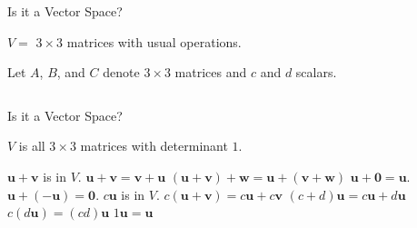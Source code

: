 \documentclass[xcolor=dvipsnames,aspectratio=169,t]{beamer}
\begin{document}
\begin{frame}{Is it a Vector Space?}
\bigskip

$V=$ $3 \times 3$ matrices with usual operations.
\bigskip

\pause
Let $A$, $B$, and $C$ denote $3 \times 3$ matrices and $c$ and $d$ scalars.

\begin{columns}[T]

\column{0.5\tw}
\bb
\ii {} \smallskip
\ii {} \smallskip
\ii {}
\ii {}
\ii  {}
\ee

\column{0.5\tw}

\bb
\addtocounter{enumi}{5}
\ii {} \ms
\ii  {} \ms
\ii  {} \ms 
\ii {} \ms
\ii {}
\ee

\end{columns}

\end{frame}


\begin{frame}{Is it a Vector Space?}
\bigskip

$V$ is all $3 \times 3$ matrices with \alert{determinant $1$}.
\bigskip

\begin{enumerate}\setlength{\itemsep}{.3em}
\ii $\mathbf{u} + \mathbf{v}$ is in $V$. 
\ii $\mathbf{u} + \mathbf{v} = \mathbf{v} + \mathbf{u}$
\ii $(\mathbf{u} + \mathbf{v}) + \mathbf{w} = \mathbf{u} + (\mathbf{v} + \mathbf{w})$
\ii $\mathbf{u} + \mathbf{0} = \mathbf{u}$.
\ii $\mathbf{u} + (- \mathbf{u}) = \mathbf{0}$.
\ii $c \mathbf{u}$ is in $V$.
\ii $c( \mathbf{u} + \mathbf{v} ) = c \mathbf{u} + c \mathbf{v}$
\ii $(c+d)  \mathbf{u} = c \mathbf{u} + d \mathbf{u}$
\ii $c (d \mathbf{u}) = (cd) \mathbf{u}$
\ii $1 \mathbf{u} = \mathbf{u}$
\end{enumerate}

\end{frame}
\end{document}

